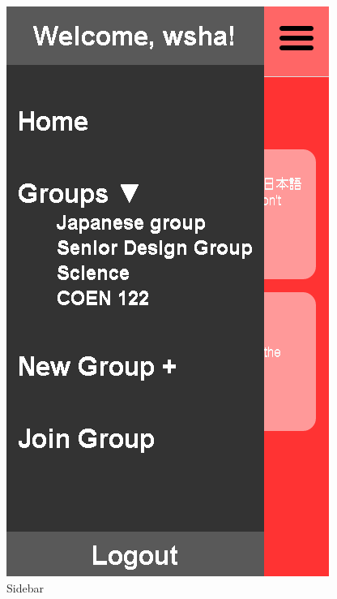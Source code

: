 \begin{figure}[h]
	\centering
	\includegraphics[scale=0.5]{images/sidebar.png}
	\caption{Sidebar}
	\label{fig:sidebar}
\end{figure}